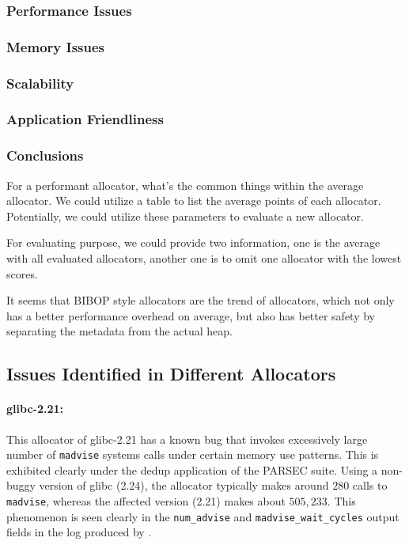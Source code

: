 \subsubsection{Performance Issues}



\subsubsection{Memory Issues}

\subsubsection{Scalability}



\subsubsection{Application Friendliness}


\subsubsection{Conclusions}

For a performant allocator, what's the common things within the average allocator. We could utilize a table to list the average points of each allocator. Potentially, we could utilize these parameters to evaluate a new allocator. 

For evaluating purpose, we could provide two information, one is the average with all evaluated allocators, another one is to omit one allocator with the lowest scores. 


It seems that BIBOP style allocators are the trend of allocators, which not only has a better performance overhead on average, but also has better safety by separating the metadata from the actual heap. 

\subsection{Issues Identified in Different Allocators}

\paragraph{glibc-2.21:}
This allocator of glibc-2.21 has a known bug that invokes excessively large number of \texttt{madvise} systems calls under certain memory use patterns. This is exhibited clearly under the dedup application of the PARSEC suite.
Using a non-buggy version of glibc (2.24), the allocator typically makes around $280$ calls to \texttt{madvise}, whereas the affected version (2.21) makes about $505,233$.
	This phenomenon is seen clearly in the \texttt{num\_advise} and \texttt{madvise\_wait\_cycles} output fields in the log produced by \MP{}.

